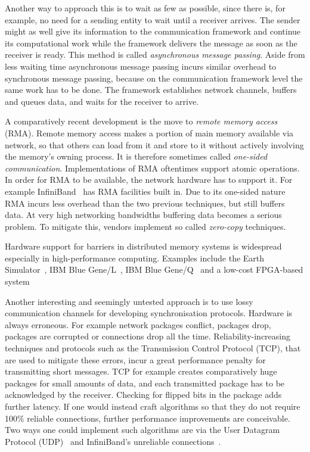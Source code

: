 \documentclass[a4paper, 10pt]{article}
\begin{document}
Another way to approach this is to wait as few as possible, since there is, for example, no need for a sending entity to wait until a receiver arrives. The sender might as well give its information to the communication framework and continue its computational work while the framework delivers the message as soon as the receiver is ready. This method is called \emph{asynchronous message passing}. Aside from less waiting time asynchronous message passing incurs similar overhead to synchronous message passing, because on the communication framework level the same work has to be done. The framework establishes network channels, buffers and queues data, and waits for the receiver to arrive.

A comparatively recent development is the move to \emph{remote memory access} (RMA). Remote memory access makes a portion of main memory available via network, so that others can load from it and store to it without actively involving the memory's owning process. It is therefore sometimes called \emph{one-sided communication}. Implementations of RMA oftentimes support atomic operations.
In order for RMA to be available, the network hardware has to support it. For example InfiniBand~\cite{infiniband} has RMA facilities built in.
Due to its one-sided nature RMA incurs less overhead than the two previous techniques, but still buffers data. At very high networking bandwidths buffering data becomes a serious problem. To mitigate this, vendors implement so called \emph{zero-copy} techniques.

Hardware support for barriers in distributed memory systems is widespread especially in high-performance computing. Examples include the Earth Simulator~\cite{earthsimulator}, IBM Blue Gene/L~\cite{bluegenel}, IBM Blue Gene/Q~\cite{bluegeneq} and a low-cost FPGA-based system~\cite{hoefler2006b}

Another interesting and seemingly untested approach is to use lossy communication channels for developing synchronisation protocols. Hardware is always erroneous. For example network packages conflict, packages drop, packages are corrupted or connections drop all the time. Reliability-increasing techniques and protocols such as the Transmission Control Protocol (TCP), that are used to mitigate these errors, incur a great performance penalty for transmitting short messages. TCP for example creates comparatively huge packages for small amounts of data, and each transmitted package has to be acknowledged by the receiver. Checking for flipped bits in the package adds further latency.
If one would instead craft algorithms so that they do not require 100\% reliable connections, further performance improvements are conceivable.
Two ways one could implement such algorithms are via the User Datagram Protocol (UDP)~\cite{udp} and InfiniBand's unreliable connections~\cite{infiniband}.
\end{document}
